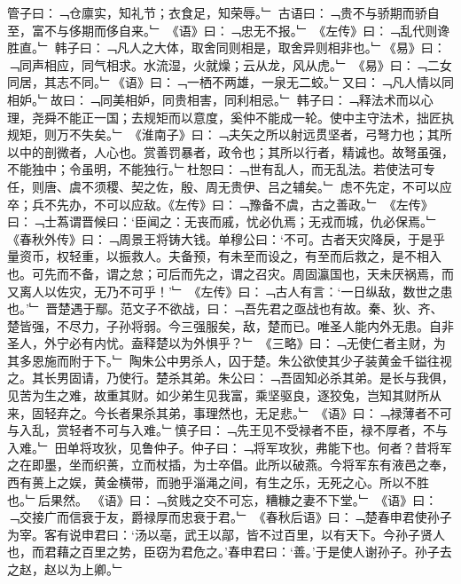 管子曰：﹁仓廪实，知礼节；衣食足，知荣辱。﹂
古语曰：﹁贵不与骄期而骄自至，富不与侈期而侈自来。﹂
《语》曰：﹁忠无不报。﹂
《左传》曰：﹁乱代则谗胜直。﹂
韩子曰：﹁凡人之大体，取舍同则相是，取舍异则相非也。﹂《易》曰：﹁同声相应，同气相求。水流湿，火就燥；云从龙，风从虎。﹂
《易》曰：﹁二女同居，其志不同。﹂《语》曰：﹁一栖不两雄，一泉无二蛟。﹂又曰：﹁凡人情以同相妒。﹂故曰：﹁同美相妒，同贵相害，同利相忌。﹂
韩子曰：﹁释法术而以心理，尧舜不能正一国；去规矩而以意度，奚仲不能成一轮。使中主守法术，拙匠执规矩，则万不失矣。﹂
《淮南子》曰：﹁夫矢之所以射远贯坚者，弓弩力也；其所以中的剖微者，人心也。赏善罚暴者，政令也；其所以行者，精诚也。故弩虽强，不能独中；令虽明，不能独行。﹂杜恕曰：﹁世有乱人，而无乱法。若使法可专任，则唐、虞不须稷、契之佐，殷、周无贵伊、吕之辅矣。﹂
虑不先定，不可以应卒；兵不先办，不可以应敌。《左传》曰：﹁豫备不虞，古之善政。﹂
《左传》曰：﹁士蒍谓晋候曰：‘臣闻之：无丧而戚，忧必仇焉；无戎而城，仇必保焉。﹂《春秋外传》曰：﹁周景王将铸大钱。单穆公曰：‘不可。古者天灾降戾，于是乎量资币，权轻重，以振救人。夫备预，有未至而设之，有至而后救之，是不相入也。可先而不备，谓之怠；可后而先之，谓之召灾。周固瀛国也，天未厌祸焉，而又离人以佐灾，无乃不可乎！’﹂
《左传》曰：﹁古人有言：‘一日纵敌，数世之患也。’﹂
晋楚遇于鄢。范文子不欲战，曰：﹁吾先君之亟战也有故。秦、狄、齐、楚皆强，不尽力，子孙将弱。今三强服矣，敌，楚而已。唯圣人能内外无患。自非圣人，外宁必有内忧。盍释楚以为外惧乎？﹂
《三略》曰：﹁无使仁者主财，为其多恩施而附于下。﹂
陶朱公中男杀人，囚于楚。朱公欲使其少子装黄金千镒往视之。其长男固请，乃使行。楚杀其弟。朱公曰：﹁吾固知必杀其弟。是长与我俱，见苦为生之难，故重其财。如少弟生见我富，乘坚驱良，逐狡兔，岂知其财所从来，固轻弃之。今长者果杀其弟，事理然也，无足悲。﹂
《语》曰：﹁禄薄者不可与入乱，赏轻者不可与入难。﹂慎子曰：﹁先王见不受禄者不臣，禄不厚者，不与入难。﹂
田单将攻狄，见鲁仲子。仲子曰：﹁将军攻狄，弗能下也。何者？昔将军之在即墨，坐而织蒉，立而杖插，为士卒倡。此所以破燕。今将军东有液邑之奉，西有蒉上之娱，黄金横带，而驰乎淄渑之间，有生之乐，无死之心。所以不胜也。﹂后果然。
《语》曰：﹁贫贱之交不可忘，糟糠之妻不下堂。﹂
《语》曰：﹁交接广而信衰于友，爵禄厚而忠衰于君。﹂
《春秋后语》曰：﹁楚春申君使孙子为宰。客有说申君曰：‘汤以亳，武王以鄗，皆不过百里，以有天下。今孙子贤人也，而君藉之百里之势，臣窃为君危之。’春申君曰：‘善。’于是使人谢孙子。孙子去之赵，赵以为上卿。﹂
